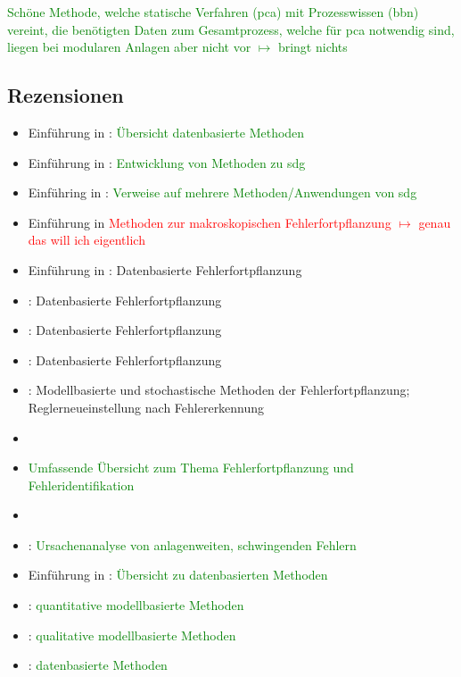 \textcolor{green}{Sch\"one Methode, welche statische Verfahren (\ac{pca}) mit Prozesswissen (\ac{bbn}) vereint, die ben\"otigten Daten zum Gesamtprozess, welche f\"ur \ac{pca} notwendig sind, liegen bei modularen Anlagen aber nicht vor $\mapsto$ bringt nichts}

\subsection{Rezensionen}
\begin{itemize}
\item Einf\"uhrung in \cite{Zhang_2017}: \textcolor{green}{\"Ubersicht datenbasierte Methoden}
\item Einf\"uhrung in \cite{Yang_2010}: \textcolor{green}{Entwicklung von Methoden zu \ac{sdg}}
\item Einf\"uhring in \cite{Mallick_2013}: \textcolor{green}{Verweise auf mehrere Methoden/Anwendungen von \ac{sdg}}
\item Einf\"uhrung in \cite{Cai_2015} \textcolor{red}{Methoden zur makroskopischen Fehlerfortpflanzung $\mapsto$ genau das will ich eigentlich }
\item Einf\"uhrung in \cite{Wang_2016}: Datenbasierte Fehlerfortpflanzung
\item \cite{Thornhill_2006}: Datenbasierte Fehlerfortpflanzung
\item \cite{Yin_2014}: Datenbasierte Fehlerfortpflanzung
\item \cite{Varga_2013}: Datenbasierte Fehlerfortpflanzung
\item \cite{Hwang_2010}: Modellbasierte und stochastische Methoden der Fehlerfortpflanzung; Reglerneueinstellung nach Fehlererkennung
\item \cite{Ng_2010}
\item \cite{Zhang2008} \textcolor{green}{Umfassende \"Ubersicht zum Thema Fehlerfortpflanzung und Fehleridentifikation}
\item \cite{Yang2012}
\item \cite{Duan2014}: \textcolor{green}{Ursachenanalyse von anlagenweiten, schwingenden Fehlern}
\item Einf\"uhrung in \cite{Li_2016}: \textcolor{green}{\"Ubersicht zu datenbasierten Methoden}
\item \cite{Venkatasubramanian_2003}: \textcolor{green}{quantitative modellbasierte Methoden}
\item \cite{Venkatasubramanian_2003a}: \textcolor{green}{qualitative modellbasierte Methoden}
\item \cite{Venkatasubramanian_2003b}: \textcolor{green}{datenbasierte Methoden}

\end{itemize}


